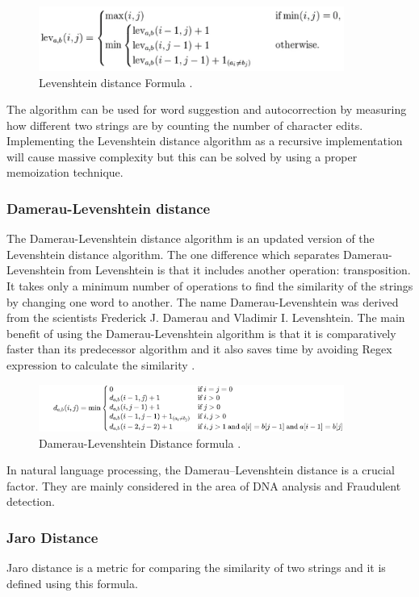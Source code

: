 \begin{figure}[h!]
	\includegraphics[width=10cm]{includes/levdist.png}
	\centering
	\caption{ Levenshtein distance Formula \cite{Cuelogic}.}
	\label{fig:levdist}
\end{figure}
The algorithm can be used for word suggestion and autocorrection by measuring how different two strings are by counting the number of character edits. Implementing the Levenshtein distance algorithm as a recursive implementation will cause massive complexity but this can be solved by using a proper memoization technique.

\subsubsection{Damerau-Levenshtein distance}
The Damerau-Levenshtein distance algorithm is an updated version of the Levenshtein distance algorithm. The one difference which separates  Damerau-Levenshtein from Levenshtein is that it includes another operation: transposition. It takes only a minimum number of operations to find the similarity of the strings by changing one word to another. The name Damerau-Levenshtein was derived from the scientists Frederick J. Damerau and Vladimir I. Levenshtein. The main benefit of using the Damerau-Levenshtein algorithm is that it is comparatively faster than its predecessor algorithm and it also saves time by avoiding Regex expression to calculate the similarity \cite{ChSa2019}. 

\begin{figure}[h!]
	\includegraphics[width=10cm]{includes/dlevidist.png}
	\centering
	\caption{ Damerau-Levenshtein Distance formula \cite{DamLeven}.}
	\label{fig:dlevidist}
\end{figure}
In natural language processing, the Damerau–Levenshtein distance is a crucial factor. They are mainly considered in the area of DNA analysis and Fraudulent detection.
\subsubsection{Jaro Distance}
Jaro distance is a metric for comparing the similarity of two strings and it is defined using this formula.

